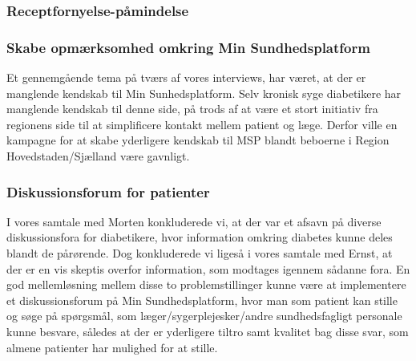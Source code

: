 \subsubsection{Receptfornyelse-påmindelse}
\subsubsection{Skabe opmærksomhed omkring Min Sundhedsplatform}
Et gennemgående tema på tværs af vores interviews, har været, at der er manglende kendskab til Min Sunhedsplatform. Selv kronisk syge diabetikere har manglende kendskab til denne side, på trods af at være et stort initiativ fra regionens side til at simplificere kontakt mellem patient og læge. Derfor ville en kampagne for at skabe yderligere kendskab til MSP blandt beboerne i Region Hovedstaden/Sjælland være gavnligt.
\subsubsection{Diskussionsforum for patienter}
I vores samtale med Morten konkluderede vi, at der var et afsavn på diverse diskussionsfora for diabetikere, hvor information omkring diabetes kunne deles blandt de pårørende.
Dog konkluderede vi ligeså i vores samtale med Ernst, at der er en vis skeptis overfor information, som modtages igennem sådanne fora. En god mellemløsning mellem disse to problemstillinger kunne være at implementere et diskussionsforum på Min Sundhedsplatform, hvor man som patient kan stille og søge på spørgsmål, som læger/sygerplejesker/andre sundhedsfagligt personale kunne besvare, således at der er yderligere tiltro samt kvalitet bag disse svar, som almene patienter har mulighed for at stille. 
